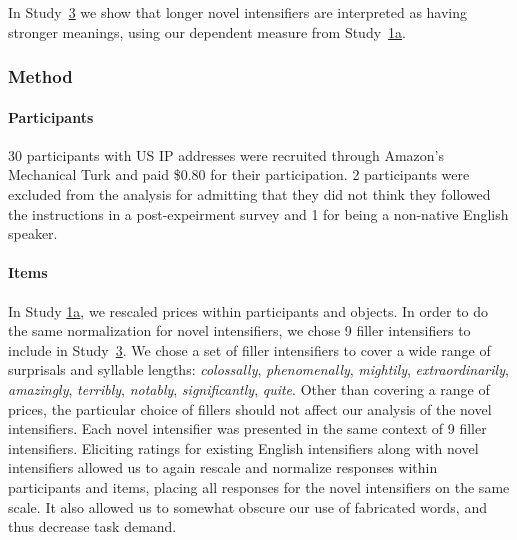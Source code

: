 \documentclass[10pt,letterpaper]{article}
\newcommand{\w}[1]{\emph{#1}}
\begin{document}

In Study~\hyperref[sec:study3]{3} we show that longer novel intensifiers are interpreted as having stronger meanings, using our dependent measure from Study~\hyperref[sec:study1a]{1a}.

\subsubsection{Method}

\paragraph{Participants}

30 participants with US IP addresses were recruited through Amazon's Mechanical Turk and paid \$0.80 for their participation. 2 participants were excluded from the analysis for admitting that they did not think they followed the instructions in a post-expeirment survey and 1 for being a non-native English speaker.

\paragraph{Items}

In Study \hyperref[sec:study1a]{1a}, we rescaled prices within participants and objects.
In order to do the same normalization for novel intensifiers, we chose 9 filler intensifiers to include in Study~\hyperref[sec:study3]{3}.
We chose a set of filler intensifiers to cover a wide range of surprisals and syllable lengths: \w{colossally}, \w{phenomenally}, \w{mightily}, \w{extraordinarily}, \w{amazingly}, \w{terribly}, \w{notably}, \w{significantly}, \w{quite}.
Other than covering a range of prices, the particular choice of fillers should not affect our analysis of the novel intensifiers.
Each novel intensifier was presented in the same context of 9 filler intensifiers.
Eliciting ratings for existing English intensifiers along with novel intensifiers allowed us to again rescale and normalize responses within participants and items, placing all responses for the novel intensifiers on the same scale.
It also allowed us to somewhat obscure our use of fabricated words, and thus decrease task demand.
\end{document}
